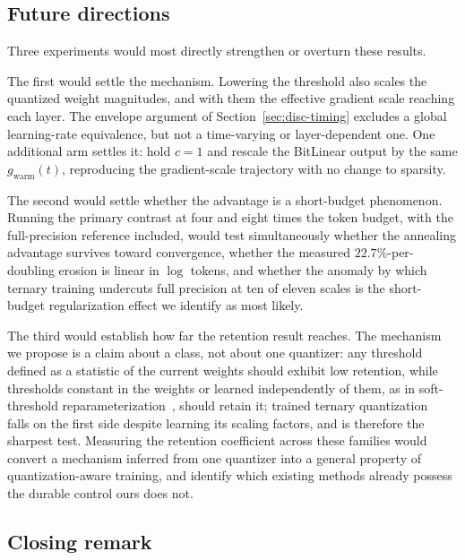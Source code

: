 \documentclass[final,5p,times,twocolumn]{elsarticle}
\theoremstyle{remark}
\begin{document}
\subsection{Future directions}
\label{sec:conc-future}

Three experiments would most directly strengthen or overturn these results.

The first would settle the mechanism. Lowering
the threshold also scales the quantized weight magnitudes, and with them the
effective gradient scale reaching each layer. The envelope argument
of Section~\ref{sec:disc-timing} excludes a global learning-rate equivalence,
but not a time-varying or layer-dependent one. One additional arm settles it:
hold $c = 1$ and
rescale the BitLinear output by the same $g_{\mathrm{warm}}(t)$, reproducing
the gradient-scale trajectory with no change to sparsity.

The second would settle whether the advantage is a short-budget phenomenon.
Running the primary
contrast at four and eight times the token budget, with the full-precision
reference included, would test simultaneously whether the annealing advantage
survives toward convergence, whether the measured $22.7\%$-per-doubling erosion
is linear in $\log$ tokens, and whether the anomaly by which ternary training
undercuts full precision at ten of eleven scales is the short-budget
regularization effect we identify as most likely.

The third would establish how far the retention result reaches. The
mechanism we propose is a claim about a class, not about one quantizer: any
threshold defined as a statistic of the current weights should exhibit low
retention, while thresholds constant in the weights or learned independently of
them, as in soft-threshold reparameterization~\cite{kusupati2020}, should
retain it; trained ternary quantization~\cite{zhu2017a} falls on the first side
despite learning its scaling factors, and is therefore the sharpest test. Measuring the retention
coefficient across these families would convert a mechanism inferred from one
quantizer into a general property of quantization-aware training, and identify
which existing methods already possess the durable control ours does not.

\subsection{Closing remark}
\label{sec:conc-closing}
\end{document}
